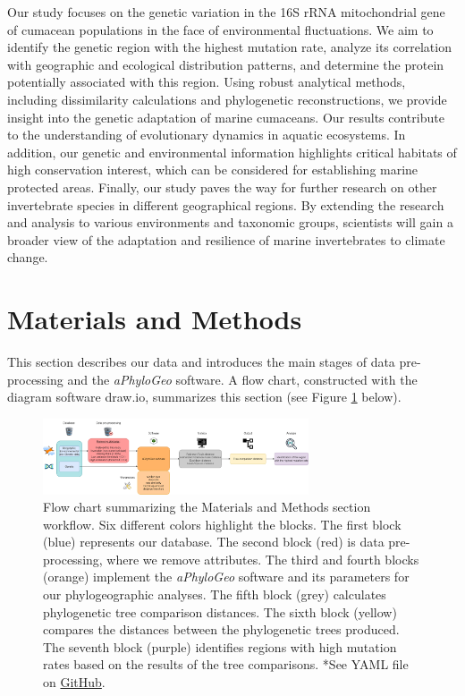 Our study focuses on the genetic variation in the 16S rRNA mitochondrial gene of cumacean populations in the face of environmental fluctuations. We aim to identify the genetic region with the highest mutation rate, analyze its correlation with geographic and ecological distribution patterns, and determine the protein potentially associated with this region. Using robust analytical methods, including dissimilarity calculations and phylogenetic reconstructions, we provide insight into the genetic adaptation of marine cumaceans. Our results contribute to the understanding of evolutionary dynamics in aquatic ecosystems. In addition, our genetic and environmental information highlights critical habitats of high conservation interest, which can be considered for establishing marine protected areas. Finally, our study paves the way for further research on other invertebrate species in different geographical regions. By extending the research and analysis to various environments and taxonomic groups, scientists will gain a broader view of the adaptation and resilience of marine invertebrates to climate change.

\section{Materials and Methods}\label{materials-methods}
This section describes our data and introduces the main stages of data pre-processing and the \textit{aPhyloGeo} software. A flow chart, constructed with the diagram software draw.io, summarizes this section (see Figure \ref{fig:fig1} below).

\begin{figure}[htbp]
    \centering
    \includegraphics[width=0.7\textwidth]{diagram.drawio.png}
    \caption{Flow chart summarizing the Materials and Methods section workflow. Six different colors highlight the blocks. The first block (blue) represents our database. The second block (red) is data pre-processing, where we remove attributes. The third and fourth blocks (orange) implement the \textit{aPhyloGeo} software and its parameters for our phylogeographic analyses. The fifth block (grey) calculates phylogenetic tree comparison distances. The sixth block (yellow) compares the distances between the phylogenetic trees produced. The seventh block (purple) identifies regions with high mutation rates based on the results of the tree comparisons. *See YAML file on \href{https://github.com/tahiri-lab/aPhyloGeo}{GitHub}. \label{fig:fig1}}
\end{figure}

